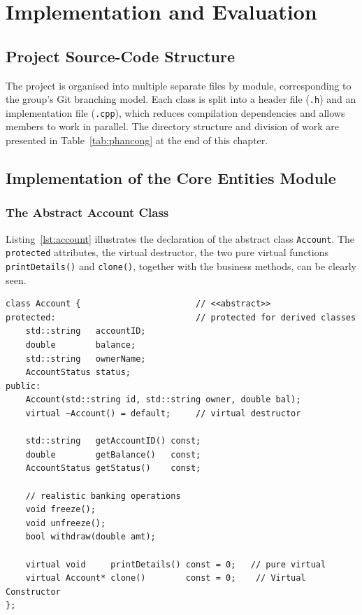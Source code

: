 \chapter{Implementation and Evaluation}

\section{Project Source-Code Structure}
    The project is organised into multiple separate files by module, corresponding to the group's Git branching model. Each class is split into a header file (\texttt{.h}) and an implementation file (\texttt{.cpp}), which reduces compilation dependencies and allows members to work in parallel. The directory structure and division of work are presented in Table~\ref{tab:phancong} at the end of this chapter.

\section{Implementation of the Core Entities Module}
    \subsection{The Abstract Account Class}
    Listing~\ref{lst:account} illustrates the declaration of the abstract class \texttt{Account}. The \texttt{protected} attributes, the virtual destructor, the two pure virtual functions \texttt{printDetails()} and \texttt{clone()}, together with the business methods, can be clearly seen.

\begin{lstlisting}[caption={Declaration of the abstract Account class}, label={lst:account}]
class Account {                       // <<abstract>>
protected:                            // protected for derived classes
    std::string   accountID;
    double        balance;
    std::string   ownerName;
    AccountStatus status;
public:
    Account(std::string id, std::string owner, double bal);
    virtual ~Account() = default;     // virtual destructor

    std::string   getAccountID() const;
    double        getBalance()   const;
    AccountStatus getStatus()    const;

    // realistic banking operations
    void freeze();
    void unfreeze();
    bool withdraw(double amt);

    virtual void     printDetails() const = 0;   // pure virtual
    virtual Account* clone()        const = 0;    // Virtual Constructor
};
\end{lstlisting}

